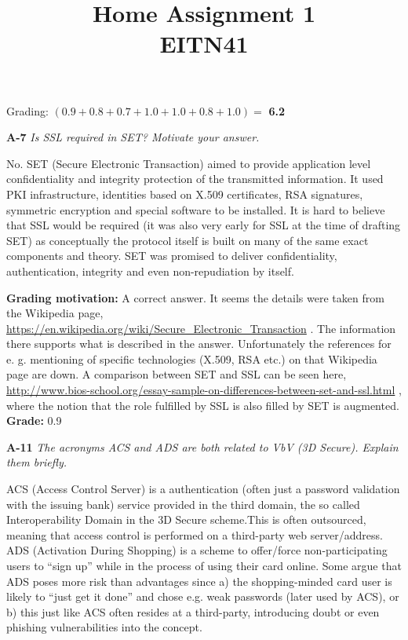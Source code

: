 \documentclass[a4paper]{article}
\title{Home Assignment 1 \\ EITN41}
\author{}
\date{}
\newcommand{\Q}[2]{
  \vspace{10pt} \textbf{#1} \textit{#2}
 }
\newcommand{\A}[1]{ #1 }
\newcommand{\Grade}[2]{ 
  \textbf{Grading motivation:} #2 \\ 
  \hspace*{\fill} \textbf{Grade:} #1 
}
\begin{document}
\maketitle

Grading: $(0.9+0.8+0.7+1.0+1.0+0.8+1.0)=$ \textbf{6.2}

\Q{A-7} {Is SSL required in SET? Motivate your answer.}

\A{
  No. SET (Secure Electronic Transaction) aimed to provide application level
  confidentiality and integrity protection of the transmitted information. It used PKI infrastructure,
  identities based on X.509 certificates, RSA signatures, symmetric encryption and special
  software to be installed. It is hard to believe that SSL would be required (it was also very early
  for SSL at the time of drafting SET) as conceptually the protocol itself is built on many of the
  same exact components and theory. SET was promised to deliver confidentiality, authentication,
  integrity and even non-repudiation by itself.
}

\Grade{0.9}{
  A correct answer. It seems the details were taken from the Wikipedia page, \url{https://en.wikipedia.org/wiki/Secure_Electronic_Transaction} . 
  The information there supports what is described in the answer.
  Unfortunately the references for e. g. mentioning of specific technologies 
  (X.509, RSA etc.) on that Wikipedia page are down.
  A comparison between SET and SSL can be seen here, \url{http://www.bios-school.org/essay-sample-on-differences-between-set-and-ssl.html} ,
  where the notion that the role fulfilled by SSL is also filled by SET
  is augmented.
}

\Q{A-11} {The acronyms ACS and ADS are both related to VbV (3D Secure). Explain
them briefly.}

\A{
  ACS (Access Control Server) is a authentication (often just a password validation with
  the issuing bank) service provided in the third domain, the so called Interoperability Domain in
  the 3D Secure scheme.This is often outsourced, meaning that access control is performed on a
  third-party web server/address. ADS (Activation During Shopping) is a scheme to offer/force
  non-participating users to “sign up” while in the process of using their card online. Some argue
  that ADS poses more risk than advantages since a) the shopping-minded card user is likely to
  “just get it done” and chose e.g. weak passwords (later used by ACS), or b) this just like ACS
  often resides at a third-party, introducing doubt or even phishing vulnerabilities into the concept.
}
\end{document}
